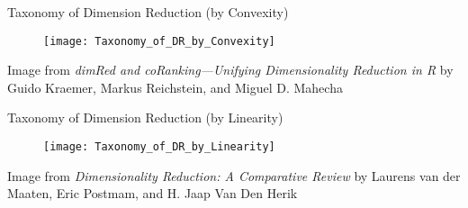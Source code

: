 \documentclass{beamer}
\begin{document}
\begin{frame}{Taxonomy of Dimension Reduction (by Convexity) }
\begin{center}
\begin{figure}[h!]
\texttt{[image: Taxonomy\_of\_DR\_by\_Convexity]}
\end{figure}
\end{center}
\footnotesize{Image from \emph{dimRed and coRanking—Unifying Dimensionality Reduction in R} by
Guido Kraemer, Markus Reichstein, and Miguel D. Mahecha}
\end{frame}


\begin{frame}{Taxonomy of Dimension Reduction (by Linearity) }
\begin{center}
\begin{figure}[h!]
\texttt{[image: Taxonomy\_of\_DR\_by\_Linearity]}
\end{figure}
\end{center}
\footnotesize{Image from \emph{Dimensionality Reduction: A Comparative Review} by Laurens van der Maaten, 
Eric Postmam, and
H. Jaap Van Den Herik
}
\end{frame}
\end{document}
